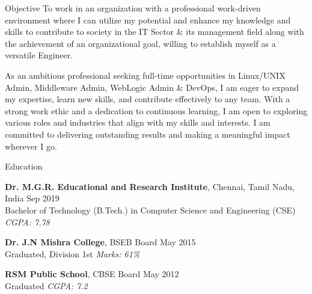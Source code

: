 \documentclass{resume} %
\begin{document}

\begin{rSection}{Objective}
To work in an organization with a professional work-driven environment where I can utilize my potential and enhance my knowledge and skills to contribute to society in the IT Sector \& its management field along with the achievement of an organizational goal, willing to establish myself as a versatile Engineer.

As an ambitious professional seeking full-time opportunities in Linux/UNIX Admin, Middleware Admin, WebLogic Admin \& DevOps, I am eager to expand my expertise, learn new skills, and contribute effectively to any team. With a strong work ethic and a dedication to continuous learning, I am open to exploring various roles and industries that align with my skills and interests. I am committed to delivering outstanding results and making a meaningful impact wherever I go.
\end{rSection}


\begin{rSection}{Education}

{\bf Dr. M.G.R. Educational and Research Institute}, Chennai, Tamil Nadu, India \hfill {Sep 2019}
\\ Bachelor of Technology (B.Tech.) in Computer Science and Engineering (CSE) \hfill \textit{CGPA: 7.78}

{\bf Dr. J.N Mishra College}, BSEB Board \hfill {May 2015}
\\ Graduated, Division 1st \hfill \textit{Marks: 61\%}

{\bf RSM Public School}, CBSE Board \hfill {May 2012}
\\ Graduated \hfill \textit{CGPA: 7.2}
\end{rSection}

\end{document}
